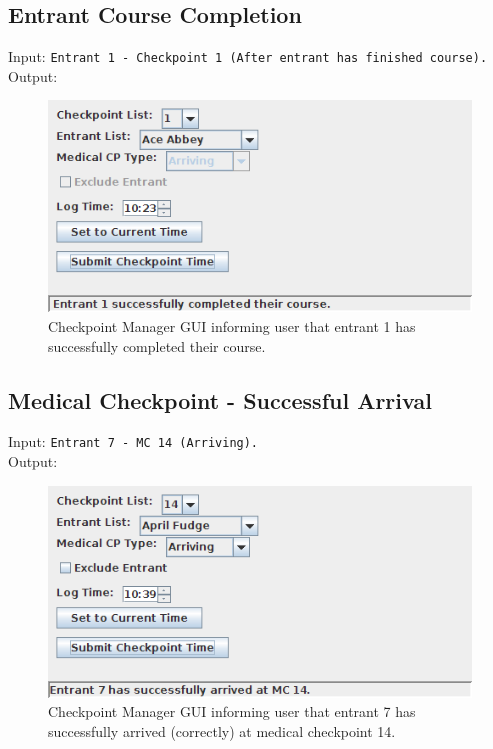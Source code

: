 \documentclass[a4paper, 10pt]{article}
\begin{document}
\clearpage
\subsection{Entrant Course Completion}

Input: \verb+Entrant 1 - Checkpoint 1 (After entrant has finished course).+ \\

Output:
\begin{figure}[ht!]
\centering
\includegraphics[scale=0.7]{cm-finished.png}
\caption{Checkpoint Manager GUI informing user that entrant 1 has successfully completed their course.}
\end{figure}

\subsection{Medical Checkpoint - Successful Arrival}

Input: \verb+Entrant 7 - MC 14 (Arriving).+ \\

Output:
\begin{figure}[ht!]
\centering
\includegraphics[scale=0.7]{cm-mcarrivesuccess.png}
\caption{Checkpoint Manager GUI informing user that entrant 7 has successfully arrived (correctly) at medical checkpoint 14.}
\end{figure}
\end{document}
